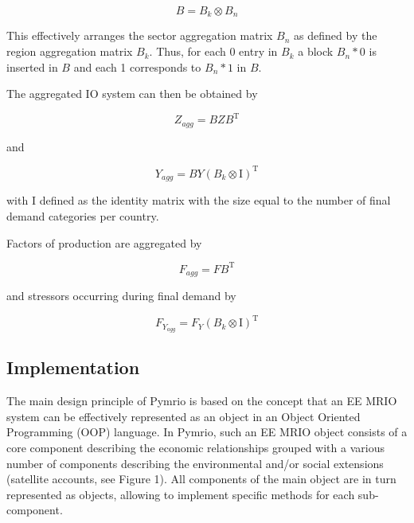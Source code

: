 \documentclass{jors}
\begin{document}
{\begin{equation}
    B = B_k \otimes B_n
\end{equation}

This effectively arranges the sector aggregation matrix $B_n$ as defined by
the region aggregation matrix $B_k$. Thus, for each 0 entry in $B_k$ a block
$B_n * 0$ is inserted in $B$ and each 1 corresponds to $B_n * 1$ in $B$.

The aggregated IO system can then be obtained by

\begin{equation}
    Z_{agg} = BZB^\mathrm{T} 
\end{equation}

and

\begin{equation}
    Y_{agg} = BY(B_k \otimes \mathrm{I})^\mathrm{T}
\end{equation}

with $\mathrm{I}$ defined as the identity matrix with the size equal to the number of final demand
categories per country.

Factors of production are aggregated by

\begin{equation}
    F_{agg} = FB^\mathrm{T} 
\end{equation}

and stressors occurring during final demand by

\begin{equation}
    F_{Y_{agg}} = F_Y(B_k \otimes \mathrm{I})^\mathrm{T}
\end{equation}

}

\subsection*{Implementation}


The main design principle of Pymrio is based on the concept that an EE MRIO system can be effectively represented as an object in an Object Oriented Programming (OOP) language.
In Pymrio, such an EE MRIO object consists of a core component describing the economic relationships grouped with a various number of components describing the environmental and/or social extensions (satellite accounts, see Figure 1). 
All components of the main object are in turn represented as objects, allowing to implement specific methods for each sub-component.
\end{document}
